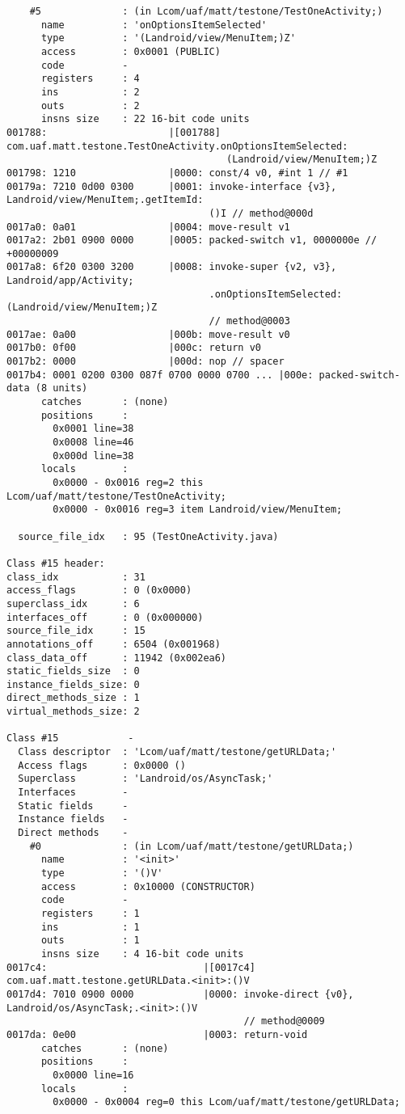 \begin{lstlisting}
    #5              : (in Lcom/uaf/matt/testone/TestOneActivity;)
      name          : 'onOptionsItemSelected'
      type          : '(Landroid/view/MenuItem;)Z'
      access        : 0x0001 (PUBLIC)
      code          -
      registers     : 4
      ins           : 2
      outs          : 2
      insns size    : 22 16-bit code units
001788:                     |[001788] com.uaf.matt.testone.TestOneActivity.onOptionsItemSelected:
                                      (Landroid/view/MenuItem;)Z
001798: 1210                |0000: const/4 v0, #int 1 // #1
00179a: 7210 0d00 0300      |0001: invoke-interface {v3}, Landroid/view/MenuItem;.getItemId:
                                   ()I // method@000d
0017a0: 0a01                |0004: move-result v1
0017a2: 2b01 0900 0000      |0005: packed-switch v1, 0000000e // +00000009
0017a8: 6f20 0300 3200      |0008: invoke-super {v2, v3}, Landroid/app/Activity;
                                   .onOptionsItemSelected:(Landroid/view/MenuItem;)Z
                                   // method@0003
0017ae: 0a00                |000b: move-result v0
0017b0: 0f00                |000c: return v0
0017b2: 0000                |000d: nop // spacer
0017b4: 0001 0200 0300 087f 0700 0000 0700 ... |000e: packed-switch-data (8 units)
      catches       : (none)
      positions     :
        0x0001 line=38
        0x0008 line=46
        0x000d line=38
      locals        :
        0x0000 - 0x0016 reg=2 this Lcom/uaf/matt/testone/TestOneActivity;
        0x0000 - 0x0016 reg=3 item Landroid/view/MenuItem;

  source_file_idx   : 95 (TestOneActivity.java)

Class #15 header:
class_idx           : 31
access_flags        : 0 (0x0000)
superclass_idx      : 6
interfaces_off      : 0 (0x000000)
source_file_idx     : 15
annotations_off     : 6504 (0x001968)
class_data_off      : 11942 (0x002ea6)
static_fields_size  : 0
instance_fields_size: 0
direct_methods_size : 1
virtual_methods_size: 2

Class #15            -
  Class descriptor  : 'Lcom/uaf/matt/testone/getURLData;'
  Access flags      : 0x0000 ()
  Superclass        : 'Landroid/os/AsyncTask;'
  Interfaces        -
  Static fields     -
  Instance fields   -
  Direct methods    -
    #0              : (in Lcom/uaf/matt/testone/getURLData;)
      name          : '<init>'
      type          : '()V'
      access        : 0x10000 (CONSTRUCTOR)
      code          -
      registers     : 1
      ins           : 1
      outs          : 1
      insns size    : 4 16-bit code units
0017c4:                           |[0017c4] com.uaf.matt.testone.getURLData.<init>:()V
0017d4: 7010 0900 0000            |0000: invoke-direct {v0}, Landroid/os/AsyncTask;.<init>:()V
                                         // method@0009
0017da: 0e00                      |0003: return-void
      catches       : (none)
      positions     :
        0x0000 line=16
      locals        :
        0x0000 - 0x0004 reg=0 this Lcom/uaf/matt/testone/getURLData;


\end{lstlisting}
